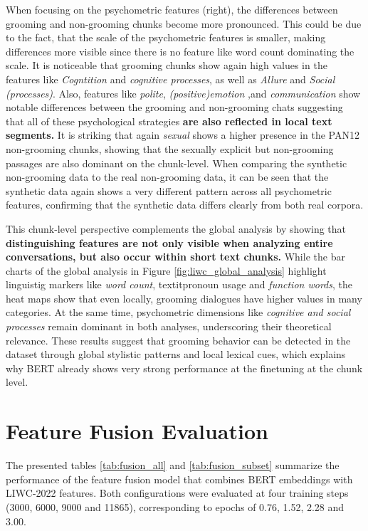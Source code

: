 When focusing on the psychometric features (right), the differences between grooming and non-grooming chunks become more pronounced. This could be due to the fact, that the scale of the psychometric features is smaller, making differences more visible since there is no feature like word count dominating the scale. It is noticeable that grooming chunks show again high values in the features like \textit{Cogntition} and \textit{cognitive processes}, as well as \textit{Allure} and \textit{Social (processes)}. Also, features like \textit{polite}, \textit{(positive)emotion} ,and \textit{communication} show notable differences between the grooming and non-grooming chats suggesting that all of these psychological strategies \textbf{are also reflected in local text segments.} It is striking that again \textit{sexual} shows a higher presence in the PAN12 non-grooming chunks, showing that the sexually explicit but non-grooming passages are also dominant on the chunk-level. When comparing the synthetic non-grooming data to the real non-grooming data, it can be seen that the synthetic data again shows a very different pattern across all psychometric features, confirming that the synthetic data differs clearly from both real corpora. 

This chunk-level perspective complements the global analysis by showing that \textbf{distinguishing features are not only visible when analyzing entire conversations, but also occur within short text chunks.} While the bar charts of the global analysis in Figure \ref{fig:liwc_global_analysis} highlight linguistig markers like \textit{word count}, textit{pronoun usage} and \textit{function words}, the heat maps show that even locally, grooming dialogues have higher values in many categories. At the same time, psychometric dimensions like \textit{cognitive and social processes} remain dominant in both analyses, underscoring their theoretical relevance. These results suggest that grooming behavior can be detected in the dataset through global stylistic patterns and local lexical cues, which explains why BERT already shows very strong performance at the finetuning at the chunk level.

\section{Feature Fusion Evaluation}




The presented tables \ref{tab:fusion_all} and \ref{tab:fusion_subset} summarize the performance of the feature fusion model that combines BERT embeddings with LIWC-2022 features. Both configurations were evaluated at four training steps (3000, 6000, 9000 and 11865), corresponding to epochs of 0.76, 1.52, 2.28 and 3.00.

